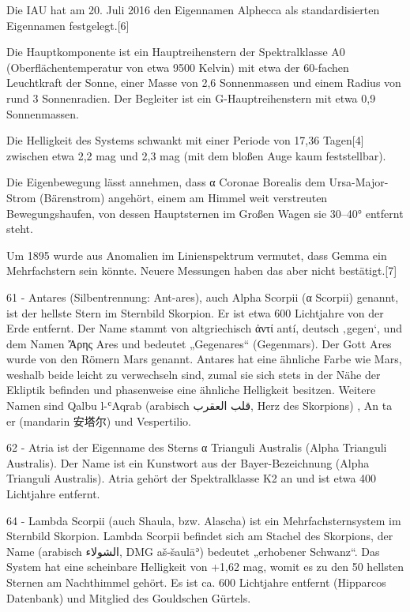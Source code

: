 Die IAU hat am 20. Juli 2016 den Eigennamen Alphecca als standardisierten Eigennamen festgelegt.[6]

Die Hauptkomponente ist ein Hauptreihenstern der Spektralklasse A0 (Oberflächentemperatur von etwa 9500 Kelvin) mit etwa der 60-fachen Leuchtkraft der Sonne, einer Masse von 2,6 Sonnenmassen und einem Radius von rund 3 Sonnenradien. Der Begleiter ist ein G-Hauptreihenstern mit etwa 0,9 Sonnenmassen.

Die Helligkeit des Systems schwankt mit einer Periode von 17,36 Tagen[4] zwischen etwa 2,2 mag und 2,3 mag (mit dem bloßen Auge kaum feststellbar).

Die Eigenbewegung lässt annehmen, dass α Coronae Borealis dem Ursa-Major-Strom (Bärenstrom) angehört, einem am Himmel weit verstreuten Bewegungshaufen, von dessen Hauptsternen im Großen Wagen sie 30–40° entfernt steht.

Um 1895 wurde aus Anomalien im Linienspektrum vermutet, dass Gemma ein Mehrfachstern sein könnte. Neuere Messungen haben das aber nicht bestätigt.[7] 



61 - Antares (Silbentrennung: Ant-ares), auch Alpha Scorpii (α Scorpii) genannt, ist der hellste Stern im Sternbild Skorpion. Er ist etwa 600 Lichtjahre von der Erde entfernt. Der Name stammt von altgriechisch ἀντί antí, deutsch ‚gegen‘, und dem Namen Ἄρης Ares und bedeutet „Gegenares“ (Gegenmars). Der Gott Ares wurde von den Römern Mars genannt. Antares hat eine ähnliche Farbe wie Mars, weshalb beide leicht zu verwechseln sind, zumal sie sich stets in der Nähe der Ekliptik befinden und phasenweise eine ähnliche Helligkeit besitzen. Weitere Namen sind Qalbu l-ʿAqrab (arabisch قلب العقرب, Herz des Skorpions) , An ta er (mandarin 安塔尔) und Vespertilio. 



62 - Atria ist der Eigenname des Sterns α Trianguli Australis (Alpha Trianguli Australis). Der Name ist ein Kunstwort aus der Bayer-Bezeichnung (Alpha Trianguli Australis). Atria gehört der Spektralklasse K2 an und ist etwa 400 Lichtjahre entfernt. 



64 - Lambda Scorpii (auch Shaula, bzw. Alascha) ist ein Mehrfachsternsystem im Sternbild Skorpion. Lambda Scorpii befindet sich am Stachel des Skorpions, der Name (arabisch الشولاء, DMG aš-šaulāʾ) bedeutet „erhobener Schwanz“. Das System hat eine scheinbare Helligkeit von +1,62 mag, womit es zu den 50 hellsten Sternen am Nachthimmel gehört. Es ist ca. 600 Lichtjahre entfernt (Hipparcos Datenbank) und Mitglied des Gouldschen Gürtels. 


